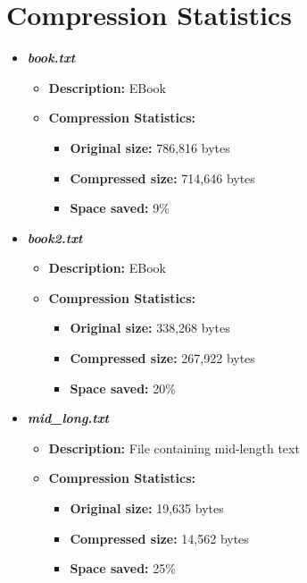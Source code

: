 \documentclass[12pt,oneside,letterpaper,english]{article}
\begin{document}
\section{Compression Statistics}
\begin{itemize}
    \item \textbf{\textit{book.txt}}
        \begin{itemize}
            \item \textbf{Description:} EBook
            \item \textbf{Compression Statistics:} 
                \begin{itemize}
                    \item \textbf{Original size:} 786,816 bytes
                    \item \textbf{Compressed size:} 714,646 bytes
                    \item \textbf{Space saved:} 9\%
                \end{itemize}
        \end{itemize}
    \item \textbf{\textit{book2.txt}}
        \begin{itemize}
            \item \textbf{Description:} EBook
            \item \textbf{Compression Statistics:} 
                \begin{itemize}
                    \item \textbf{Original size:} 338,268 bytes
                    \item \textbf{Compressed size:} 267,922 bytes
                    \item \textbf{Space saved:} 20\%
                \end{itemize}
        \end{itemize}
    \item \textbf{\textit{mid\_long.txt}}
        \begin{itemize}
            \item \textbf{Description:} File containing mid-length text
            \item \textbf{Compression Statistics:} 
                \begin{itemize}
                    \item \textbf{Original size:} 19,635 bytes
                    \item \textbf{Compressed size:} 14,562 bytes
                    \item \textbf{Space saved:} 25\%

\end{itemize}
\end{itemize}
\end{itemize}
\end{document}
